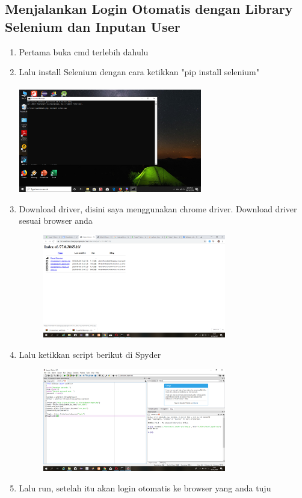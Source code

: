 \documentclass{article}
\begin{document}
\subsection{Menjalankan Login Otomatis dengan Library Selenium dan Inputan User}
\begin{enumerate}
    \item Pertama buka cmd terlebih dahulu
    \item Lalu install Selenium dengan cara ketikkan "pip install selenium"
        \paragraph{}
            \centerline{\includegraphics[width=8cm]{image/pipinstallsel.png}}
    \item Download driver, disini saya menggunakan chrome driver. Download driver sesuai browser anda
        \begin{figure}[h]
            \centerline{\includegraphics[width=8cm]{image/chromedriver.png}}
        \end{figure}
    \item Lalu ketikkan script berikut di Spyder
        \begin{figure}[h]
            \centerline{\includegraphics[width=8cm]{image/scriptsele.png}}
        \end{figure}
    \item Lalu run, setelah itu akan login otomatis ke browser yang anda tuju
\end{enumerate}
\newpage
\end{document}
